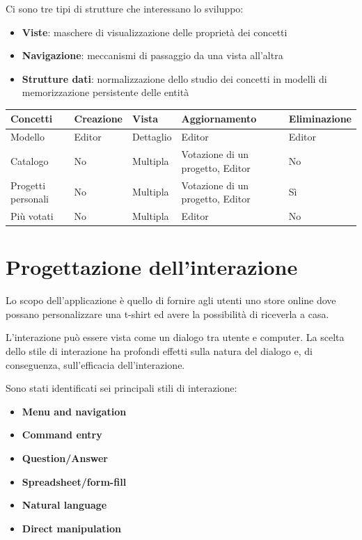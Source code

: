 \documentclass[12pt,italian,]{report}
\providecommand{\tightlist}{%
  \setlength{\itemsep}{0pt}\setlength{\parskip}{0pt}}
\begin{document}
Ci sono tre tipi di strutture che interessano lo sviluppo:

\begin{itemize}
\tightlist
\item
  \textbf{Viste}: maschere di visualizzazione delle proprietà dei
  concetti
\item
  \textbf{Navigazione}: meccanismi di passaggio da una vista all'altra
\item
  \textbf{Strutture dati}: normalizzazione dello studio dei concetti in
  modelli di memorizzazione persistente delle entità
\end{itemize}

\begin{longtable}[]{|l|l|l|l|l|}
\toprule
Concetti & Creazione & Vista & Aggiornamento &
Eliminazione\tabularnewline
\midrule
\endhead
Modello & Editor & Dettaglio & Editor & Editor\tabularnewline
Catalogo & No & Multipla & Votazione di un progetto, Editor & No\tabularnewline
Progetti personali & No & Multipla & Votazione di un progetto, Editor & Sì\tabularnewline
Più votati & No & Multipla & Editor & No\tabularnewline
\bottomrule
\end{longtable}

\hypertarget{progettazione-dellinterazione}{%
\section{Progettazione
dell'interazione}\label{progettazione-dellinterazione}}

Lo scopo dell'applicazione è quello di fornire agli utenti uno store
online dove possano personalizzare una t-shirt ed avere la possibilità
di riceverla a casa.

L'interazione può essere vista come un dialogo tra utente e computer. La
scelta dello stile di interazione ha profondi effetti sulla natura del
dialogo e, di conseguenza, sull'efficacia dell'interazione.

Sono stati identificati sei principali stili di interazione:

\begin{itemize}
\tightlist
\item
  \textbf{Menu and navigation}
\item
  \textbf{Command entry}
\item
  \textbf{Question/Answer}
\item
  \textbf{Spreadsheet/form-fill}
\item
  \textbf{Natural language}
\item
  \textbf{Direct manipulation}
\end{itemize}
\end{document}
